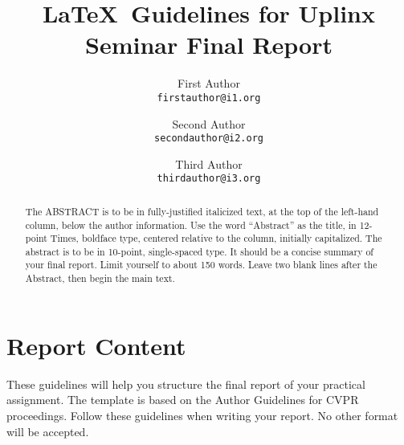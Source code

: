 \documentclass[10pt,twocolumn,letterpaper]{article}
\begin{document}
\title{\LaTeX\ Guidelines for Uplinx Seminar Final Report}

\author{First Author\\
{\tt\small firstauthor@i1.org}
\and
Second Author\\
{\tt\small secondauthor@i2.org}
\and
Third Author\\
{\tt\small thirdauthor@i3.org}
}

\maketitle

\begin{abstract}
   The ABSTRACT is to be in fully-justified italicized text, at the top
   of the left-hand column, below the author information. Use the word 
   ``Abstract'' as the title, in 12-point Times, boldface type, centered 
   relative to the column, initially capitalized. The abstract is to be 
   in 10-point, single-spaced type. It should be a concise summary of 
   your final report. Limit yourself to about 150 words. 
   Leave two blank lines after the Abstract, then begin the main text.   
   
\end{abstract}

\section{Report Content}
These guidelines will help you structure the final report of your practical 
assignment. The template is based on the Author Guidelines for CVPR 
proceedings. Follow these guidelines when writing your report. No other 
format will be accepted.



\end{document}
